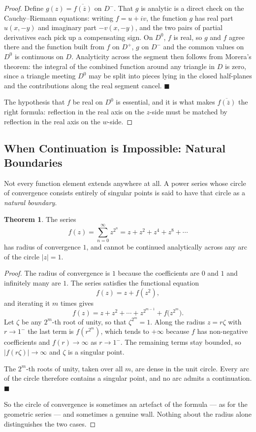 \documentclass[11pt,a4paper]{article}
\theoremstyle{definition}
\newtheorem{thm}{Theorem}[section]
\begin{document}
\begin{proof}
Define $g(z) = \overline{f(\overline{z})}$ on $D^{-}$. That $g$ is analytic is a
direct check on the Cauchy--Riemann equations: writing $f = u + iv$, the function
$g$ has real part $u(x,-y)$ and imaginary part $-v(x,-y)$, and the two pairs of
partial derivatives each pick up a compensating sign. On $D^{0}$, $f$ is real, so
$g$ and $f$ agree there and the function built from $f$ on $D^{+}$, $g$ on
$D^{-}$ and the common values on $D^{0}$ is continuous on $D$. Analyticity across
the segment then follows from Morera's theorem: the integral of the combined
function around any triangle in $D$ is zero, since a triangle meeting $D^0$ may
be split into pieces lying in the closed half-planes and the contributions along
the real segment cancel. $\blacksquare$

The hypothesis that $f$ be real on $D^0$ is essential, and it is what makes
$\overline{f(\overline{z})}$ the right formula: reflection in the real axis on the
$z$-side must be matched by reflection in the real axis on the $w$-side.
\end{proof}

{\color[wave]{485}\subsection{When Continuation is Impossible: Natural Boundaries}}

Not every function element extends anywhere at all. A power series whose circle of
convergence consists entirely of singular points is said to have that circle as a
\emph{natural boundary}.

\begin{thm}
The series
$$f(z) = \sum^{\infty}_{n = 0} z^{2^n} = z + z^2 + z^4 + z^8 + \cdots$$
has radius of convergence $1$, and cannot be continued analytically across any
arc of the circle $\left|z\right| = 1$.
\end{thm}

\begin{proof}
The radius of convergence is $1$ because the coefficients are $0$ and $1$ and
infinitely many are $1$. The series satisfies the functional equation
$$f(z) = z + f(z^2),$$
and iterating it $m$ times gives
$$f(z) = z + z^2 + \cdots + z^{2^{m-1}} + f\big(z^{2^m}\big).$$
Let $\zeta$ be any $2^m$-th root of unity, so that $\zeta^{2^m} = 1$. Along the
radius $z = r\zeta$ with $r \rightarrow 1^{-}$ the last term is $f(r^{2^m})$,
which tends to $+\infty$ because $f$ has non-negative coefficients and
$f(r) \rightarrow \infty$ as $r \rightarrow 1^{-}$. The remaining terms stay
bounded, so $\left|f(r\zeta)\right| \rightarrow \infty$ and $\zeta$ is a singular
point.

The $2^m$-th roots of unity, taken over all $m$, are dense in the unit circle.
Every arc of the circle therefore contains a singular point, and no arc admits a
continuation. $\blacksquare$

So the circle of convergence is sometimes an artefact of the formula --- as for
the geometric series --- and sometimes a genuine wall. Nothing about the radius
alone distinguishes the two cases.
\end{proof}
\end{document}
